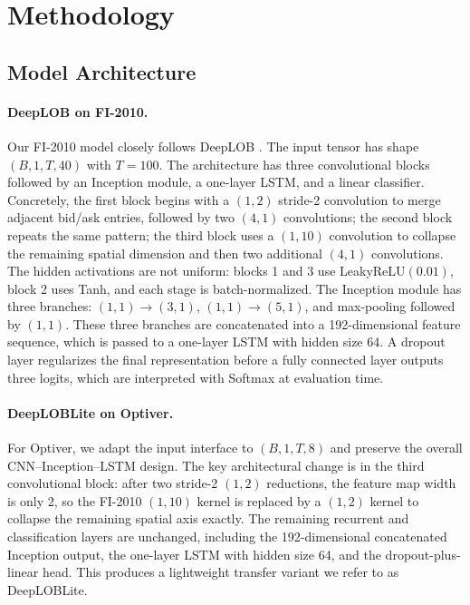 \documentclass[11pt]{article}
\begin{document}
\section{Methodology}
\subsection{Model Architecture}
\paragraph{DeepLOB on FI-2010.}
Our FI-2010 model closely follows DeepLOB \cite{zhang2019deeplob}. The input tensor has shape $(B,1,T,40)$ with $T=100$. The architecture has three convolutional blocks followed by an Inception module, a one-layer LSTM, and a linear classifier. Concretely, the first block begins with a $(1,2)$ stride-2 convolution to merge adjacent bid/ask entries, followed by two $(4,1)$ convolutions; the second block repeats the same pattern; the third block uses a $(1,10)$ convolution to collapse the remaining spatial dimension and then two additional $(4,1)$ convolutions. The hidden activations are not uniform: blocks 1 and 3 use LeakyReLU$(0.01)$, block 2 uses Tanh, and each stage is batch-normalized. The Inception module has three branches: $(1,1) \rightarrow (3,1)$, $(1,1) \rightarrow (5,1)$, and max-pooling followed by $(1,1)$. These three branches are concatenated into a 192-dimensional feature sequence, which is passed to a one-layer LSTM with hidden size 64. A dropout layer regularizes the final representation before a fully connected layer outputs three logits, which are interpreted with Softmax at evaluation time.

\paragraph{DeepLOBLite on Optiver.}
For Optiver, we adapt the input interface to $(B,1,T,8)$ and preserve the overall CNN--Inception--LSTM design. The key architectural change is in the third convolutional block: after two stride-2 $(1,2)$ reductions, the feature map width is only 2, so the FI-2010 $(1,10)$ kernel is replaced by a $(1,2)$ kernel to collapse the remaining spatial axis exactly. The remaining recurrent and classification layers are unchanged, including the 192-dimensional concatenated Inception output, the one-layer LSTM with hidden size 64, and the dropout-plus-linear head. This produces a lightweight transfer variant we refer to as DeepLOBLite.
\end{document}
